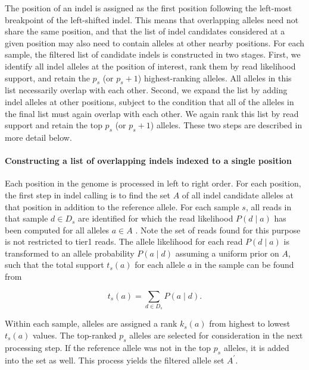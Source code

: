 \documentclass{article}
\begin{document}
The position of an indel is assigned as the first position following the left-most breakpoint of the left-shifted indel. This means that overlapping alleles need not share the same position, and that the list of indel candidates considered at a given position may also need to contain alleles at other nearby positions. For each sample, the filtered list of candidate indels is constructed in two stages. First, we identify all indel alleles at the position of interest, rank them by read likelihood support, and retain the $p_s$ (or $p_s+1$) highest-ranking alleles. All alleles in this list necessarily overlap with each other. Second, we expand the list by adding indel alleles at other positions, subject to the condition that all of the alleles in the final list must again overlap with each other. We again rank this list by read support and retain the top $p_s$ (or $p_s+1$) alleles. These two steps are described in more detail below.

\paragraph{Constructing a list of overlapping indels indexed to a single position}

Each position in the genome is processed in left to right order. For each position, the first step in indel calling is to find the set $A$ of all indel candidate alleles at that position in addition to the reference allele. For each sample $s$, all reads in that sample $d \in D_s$ are identified for which the read likelihood $P(d \mid a)$ has been computed for all alleles $a \in A$ . Note the set of reads found for this purpose is not restricted to tier1 reads. The allele likelihood for each read $P(d \mid a)$ is transformed to an allele probability $P(a \mid d)$ assuming a uniform prior on $A$, such that the total support $t_s(a)$ for each allele $a$ in the sample can be found from

\begin{equation}
\label{eq:perSampleAlleleSupport}
t_s(a) = \sum_{d \in D_s}{P(a \mid d)}.
\end{equation}

Within each sample, alleles are assigned a rank $k_s(a)$ from highest to lowest $t_s(a)$ values. The top-ranked $p_s$ alleles are selected for consideration in the next processing step. If the reference allele was not in the top $p_s$ alleles, it is added into the set as well. This process yields the filtered allele set $A^{\prime}$.
\begin{comment}
Note that any \emph{forced genotype} indel alleles removed from consideration here will be revisited in a subsequent step to ensure that they are genotyped and emitted in the final VCF output.
\end{comment}
\end{document}
